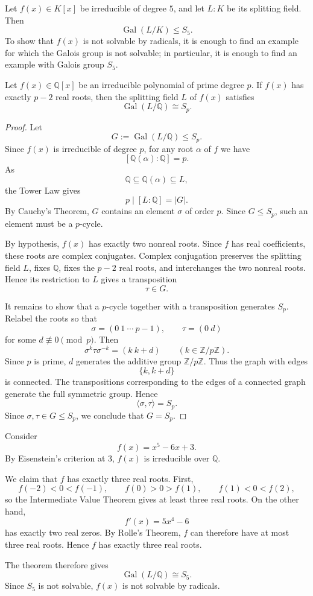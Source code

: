 Let $f(x)\in K[x]$ be irreducible of degree $5$, and let $L:K$ be its splitting field. Then
\[
\operatorname{Gal}(L/K)\leq S_5.
\]
To show that $f(x)$ is not solvable by radicals, it is enough to find an example for which the Galois group is not solvable; in particular, it is enough to find an example with Galois group $S_5$.

\begin{theorem}
Let $f(x)\in\mathbb Q[x]$ be an irreducible polynomial of prime degree $p$. If $f(x)$ has exactly $p-2$ real roots, then the splitting field $L$ of $f(x)$ satisfies
\[
\operatorname{Gal}(L/\mathbb Q)\cong S_p.
\]
\end{theorem}

\begin{proof}
    Let
    \[
    G:=\operatorname{Gal}(L/\mathbb Q)\leq S_p.
    \]
    Since $f(x)$ is irreducible of degree $p$, for any root $\alpha$ of $f$ we have
    \[
    [\mathbb Q(\alpha):\mathbb Q]=p.
    \]
    As
    \[
    \mathbb Q\subseteq\mathbb Q(\alpha)\subseteq L,
    \]
    the Tower Law gives
    \[
    p\mid [L:\mathbb Q]=|G|.
    \]
    By Cauchy's Theorem, $G$ contains an element $\sigma$ of order $p$. Since $G\leq S_p$, such an element must be a $p$-cycle.

    By hypothesis, $f(x)$ has exactly two nonreal roots. Since $f$ has real coefficients, these roots are complex conjugates. Complex conjugation preserves the splitting field $L$, fixes $\mathbb Q$, fixes the $p-2$ real roots, and interchanges the two nonreal roots. Hence its restriction to $L$ gives a transposition
    \[
    \tau\in G.
    \]

    It remains to show that a $p$-cycle together with a transposition generates $S_p$. Relabel the roots so that
    \[
    \sigma=(0\ 1\ \cdots\ p-1),
    \qquad
    \tau=(0\ d)
    \]
    for some $d\not\equiv 0\pmod p$. Then
    \[
    \sigma^k\tau\sigma^{-k}=(k\ k+d)
    \qquad (k\in\mathbb Z/p\mathbb Z).
    \]
    Since $p$ is prime, $d$ generates the additive group $\mathbb Z/p\mathbb Z$. Thus the graph with edges
    \[
    \{k,k+d\}
    \]
    is connected. The transpositions corresponding to the edges of a connected graph generate the full symmetric group. Hence
    \[
    \langle\sigma,\tau\rangle=S_p.
    \]
    Since $\sigma,\tau\in G\leq S_p$, we conclude that $G=S_p$.
\end{proof}

\begin{example}
Consider
\[
f(x)=x^5-6x+3.
\]
By Eisenstein's criterion at $3$, $f(x)$ is irreducible over $\mathbb Q$.

We claim that $f$ has exactly three real roots. First,
\[
f(-2)<0<f(-1),
\qquad
f(0)>0>f(1),
\qquad
f(1)<0<f(2),
\]
so the Intermediate Value Theorem gives at least three real roots. On the other hand,
\[
f'(x)=5x^4-6
\]
has exactly two real zeros. By Rolle's Theorem, $f$ can therefore have at most three real roots. Hence $f$ has exactly three real roots.

The theorem therefore gives
\[
\operatorname{Gal}(L/\mathbb Q)\cong S_5.
\]
Since $S_5$ is not solvable, $f(x)$ is not solvable by radicals.
\end{example}
